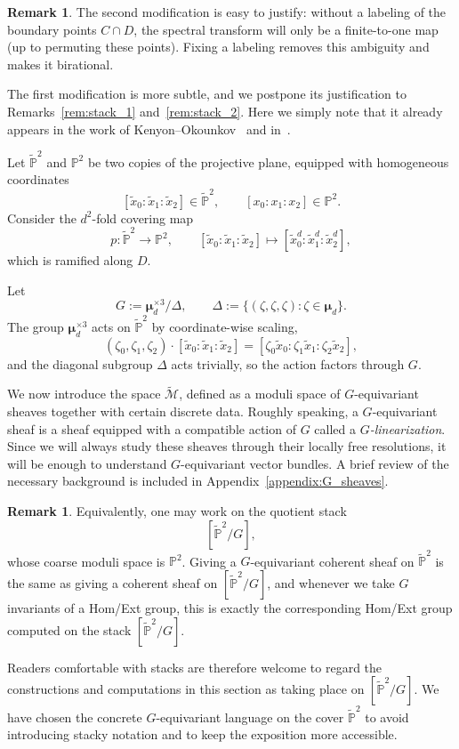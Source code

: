 \documentclass[dvipsnames,11pt]{article}
\theoremstyle{definition}
\newtheorem{remark}[theorem]{Remark}
\renewcommand{\P}{{\mathbb P}}
\newcommand{\bmu}{\bm \mu}
\begin{document}
\begin{remark}\label{rem:why-two-mods}
The second modification is easy to justify: without a labeling of the boundary points $C\cap D$, the spectral transform will only be a finite-to-one map (up to permuting these points).  Fixing a labeling removes this ambiguity and makes it birational.

The first modification is more subtle, and we postpone its justification to Remarks~\ref{rem:stack_1} and~\ref{rem:stack_2}. Here we simply note that it already appears in the work of Kenyon--Okounkov~\cite{KO} and in~\cite{TWZ}.
\end{remark}


Let $\widetilde\P^2$ and $\P^2$ be two copies of the projective plane, equipped with
homogeneous coordinates
\[
[\widetilde x_0:\widetilde x_1:\widetilde x_2]\in \widetilde\P^2,
\qquad
[x_0:x_1:x_2]\in \P^2.
\]
Consider the $d^2$-fold covering map
\[
p:\widetilde\P^2\rightarrow \P^2,
\qquad
[\widetilde x_0:\widetilde x_1:\widetilde x_2]\mapsto
[\widetilde x_0^{d}:\widetilde x_1^{d}:\widetilde x_2^{d}],
\]
which is ramified along $D$.

Let
\[
G:=\bmu_d^{\times 3}/\Delta,
\qquad
\Delta:=\{(\zeta,\zeta,\zeta):\zeta\in\bmu_d\}.
\]
The group $\bmu_d^{\times 3}$ acts on $\widetilde\P^2$ by coordinate-wise scaling,
\[
(\zeta_0,\zeta_1,\zeta_2)\cdot[\widetilde x_0:\widetilde x_1:\widetilde x_2]
=
[\zeta_0\widetilde x_0:\zeta_1\widetilde x_1:\zeta_2\widetilde x_2],
\]
and the diagonal subgroup $\Delta$ acts trivially, so the action factors through $G$.


We now introduce the space $\widetilde{\mathcal M}$, defined as a moduli space of $G$-equivariant sheaves together with certain discrete data. Roughly speaking, a $G$-equivariant sheaf is a sheaf equipped with a compatible action of $G$ called a \emph{$G$-linearization}. Since we will always study these sheaves through their locally free resolutions, it will be enough to understand $G$-equivariant vector bundles. A brief review of the necessary background is included in Appendix~\ref{appendix:G_sheaves}.



\begin{remark}\label{rem:stack_why}
Equivalently, one may work on the quotient stack
\[
 [\widetilde{\P}^2/G],
\]
whose coarse moduli space is $\P^2$. Giving a $G$-equivariant coherent sheaf on $\widetilde{\P}^2$ is the same as giving a coherent sheaf on $[\widetilde{\P}^2/G]$, and whenever we take $G$ invariants of a Hom/Ext group, this is exactly the corresponding Hom/Ext group computed on the stack $[\widetilde{\P}^2/G]$.

Readers comfortable with stacks are therefore welcome to regard the constructions and computations in
this section as taking place on $[\widetilde{\P}^2/G]$.
We have chosen the concrete $G$-equivariant language on the cover $\widetilde{\P}^2$ to avoid introducing
stacky notation and to keep the exposition more accessible.
\end{remark}
\end{document}
